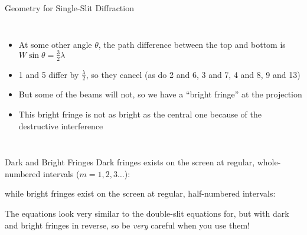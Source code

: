 \documentclass[compress,aspectratio=169]{beamer}
\newcommand{\eq}[2]{\vspace{#1}{\LARGE\begin{displaymath}#2\end{displaymath}}}
\begin{document}
\begin{frame}{Geometry for Single-Slit Diffraction}
  \begin{columns}

    \begin{itemize}
    \item At some other angle $\theta$, the path difference between the top
      and bottom is $W\sin\theta=\frac32\lambda$
    \item 1 and 5 differ by $\displaystyle\frac{\lambda}{2}$, so they cancel
      (as do 2 and 6, 3 and 7, 4 and 8, 9 and 13)
    \item But some of the beams will not, so we have a ``bright fringe'' at the 
      projection
    \item This bright fringe is not as bright as the central one because
      of the destructive interference
    \end{itemize}
  \end{columns}
\end{frame}



\begin{frame}{Dark and Bright Fringes}
  Dark fringes exists on the screen at regular, whole-numbered intervals
  ($m=1,2,3\ldots$):

  \eq{-.2in}{
    \boxed{m\lambda=W\sin\theta_m}
  }

  while bright fringes exist on the screen at regular, half-numbered intervals:

  \eq{-.2in}{
    \boxed{\left(m+\frac12\right)\lambda=W\sin\theta_m}
  }

  The equations look very similar to the double-slit equations for, but with
  dark and bright fringes in reverse, so be \emph{very} careful when you use
  them!
\end{frame}
\end{document}
